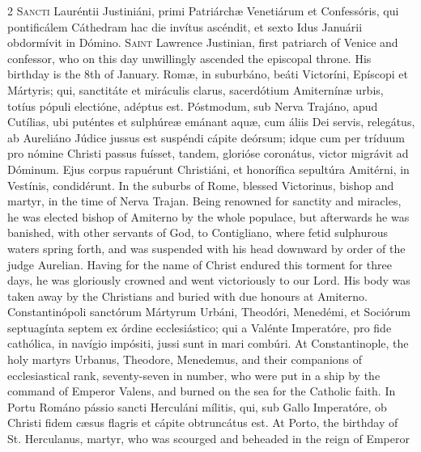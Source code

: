\begin{paracol}{2}
\lettrine[lines=2]{S}{ancti} Lauréntii 
 Justiniáni, primi Patriárchæ Venetiárum et Confessóris, qui pontificálem 
 Cáthedram hac die invítus ascéndit, et sexto Idus Januárii obdormívit in 
 Dómino.
\switchcolumn
{}
\lettrine[lines=2]{S}{aint} Lawrence Justinian, first 
 patriarch of Venice and confessor, who on this day unwillingly ascended the 
 episcopal throne. His birthday is the 8th of January.
\switchcolumn*
{}
Romæ, in suburbáno, 
 beáti Victoríni, Epíscopi et Mártyris; qui, sanctitáte et miráculis clarus, 
 sacerdótium Amiternínæ urbis, totíus pópuli electióne, adéptus est. 
 Póstmodum, sub Nerva Trajáno, apud Cutílias, ubi puténtes et sulphúreæ 
 emánant aquæ, cum áliis Dei servis, relegátus, ab Aureliáno Júdice jussus 
 est suspéndi cápite deórsum; idque cum per tríduum pro nómine Christi passus 
 fuísset, tandem, glorióse coronátus, victor migrávit ad Dóminum. Ejus 
 corpus rapuérunt Christiáni, et honorífica sepultúra Amitérni, in Vestínis, 
 condidérunt.
\switchcolumn
{}
In the suburbs of Rome, blessed 
 Victorinus, bishop and martyr, in the time of Nerva Trajan. Being 
 renowned for sanctity and miracles, he was elected bishop of Amiterno by the 
 whole populace, but afterwards he was banished, with other servants of God, 
 to Contigliano, where fetid sulphurous waters spring forth, and was 
 suspended with his head downward by order of the judge Aurelian. 
 Having for the name of Christ endured this torment for three days, he was 
 gloriously crowned and went victoriously to our Lord. His body was 
 taken away by the Christians and buried with due honours at Amiterno.
\switchcolumn*
{}
Constantinópoli 
 sanctórum Mártyrum Urbáni, Theodóri, Menedémi, et Sociórum septuagínta 
 septem ex órdine ecclesiástico; qui a Valénte Imperatóre, pro fide cathólica, 
 in navígio impósiti, jussi sunt in mari combúri.
\switchcolumn
{}
At Constantinople, the holy martyrs 
 Urbanus, Theodore, Menedemus, and their companions of ecclesiastical rank, 
 seventy-seven in number, who were put in a ship by the command of Emperor 
 Valens, and burned on the sea for the Catholic faith.
\switchcolumn*
{}
In Portu Románo pássio 
 sancti Herculáni mílitis, qui, sub Gallo Imperatóre, ob Christi fidem cæsus 
 flagris et cápite obtruncátus est.
\switchcolumn
{}
At Porto, the birthday of St. 
 Herculanus, martyr, who was scourged and beheaded in the reign of Emperor 

\end{paracol}
